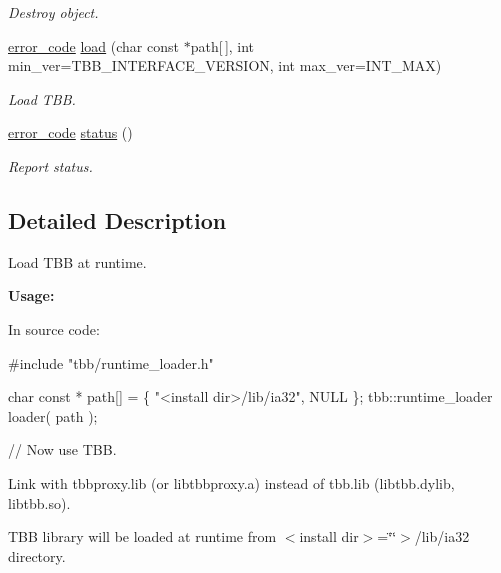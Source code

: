 \begin{DoxyCompactItemize}
\begin{DoxyCompactList}\small\item\em Destroy object. \end{DoxyCompactList}\item 
\hyperlink{classtbb_1_1interface6_1_1runtime__loader_a264674772d9f4240d89aa9d939c1eef7}{error\+\_\+code} \hyperlink{classtbb_1_1interface6_1_1runtime__loader_a310c035a72be0a9da3795758365562fa}{load} (char const $\ast$path\mbox{[}$\,$\mbox{]}, int min\+\_\+ver=T\+B\+B\+\_\+\+I\+N\+T\+E\+R\+F\+A\+C\+E\+\_\+\+V\+E\+R\+S\+I\+O\+N, int max\+\_\+ver=I\+N\+T\+\_\+\+M\+A\+X)
\begin{DoxyCompactList}\small\item\em Load T\+B\+B. \end{DoxyCompactList}\item 
\hyperlink{classtbb_1_1interface6_1_1runtime__loader_a264674772d9f4240d89aa9d939c1eef7}{error\+\_\+code} \hyperlink{classtbb_1_1interface6_1_1runtime__loader_a2b1363263a2ad8b81dca8e2957943a07}{status} ()
\begin{DoxyCompactList}\small\item\em Report status. \end{DoxyCompactList}\end{DoxyCompactItemize}


\subsection{Detailed Description}
Load T\+B\+B at runtime. 

{\bfseries Usage\+:} 

In source code\+:


\begin{DoxyCode}
\textcolor{preprocessor}{#include "tbb/runtime\_loader.h"}

\textcolor{keywordtype}{char} \textcolor{keyword}{const} * path[] = \{ \textcolor{stringliteral}{"<install dir>/lib/ia32"}, NULL \};
tbb::runtime\_loader loader( path );

\textcolor{comment}{// Now use TBB.}
\end{DoxyCode}


Link with {\ttfamily tbbproxy.\+lib} (or {\ttfamily libtbbproxy.\+a}) instead of {\ttfamily tbb.\+lib} ({\ttfamily libtbb.\+dylib}, {\ttfamily libtbb.\+so}).

T\+B\+B library will be loaded at runtime from {\ttfamily } $<$install dir$>$=\char`\"{}\char`\"{}$>$/lib/ia32 directory.

